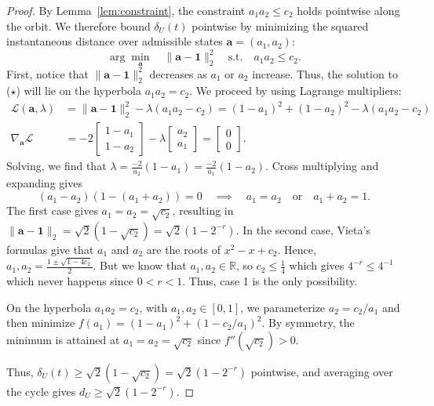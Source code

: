\documentclass[pmlr]{jmlr} %
\begin{document}
\begin{proof}
By Lemma~\ref{lem:constraint}, the constraint $a_1a_2\le c_2$ holds pointwise along the orbit. We therefore bound $\delta_U(t)$ pointwise by minimizing the squared instantaneous distance over admissible states $\mathbf{a}=(a_1,a_2)$:
\begin{equation*}
\arg\min_\mathbf{a} \quad \|\mathbf{a}-\mathbf{1}\|_2^2 \quad \text{s.t.} \quad a_1a_2\le c_2\tag{$\star$}.
\end{equation*}
First, notice that $\|\mathbf{a}-\mathbf{1}\|_2^2$ decreases as $a_1$ or $a_2$ increase. Thus, the solution to ($\star$) will lie on the hyperbola $a_1a_2=c_2$. We proceed by using Lagrange multipliers:
\begin{align}
    \mathcal{L}(\mathbf a,\lambda)&=\|\mathbf a-\mathbf 1\|_2^2 -\lambda(a_1a_2-c_2) =(1-a_1)^2+(1-a_2)^2-\lambda(a_1a_2-c_2)\\
    \nabla_\mathbf{a}\mathcal{L} &= -2\begin{bmatrix}1-a_1\\1-a_2\end{bmatrix} -\lambda \begin{bmatrix}a_2\\a_1\end{bmatrix}=\begin{bmatrix}0\\0\end{bmatrix}.
\end{align}
Solving, we find that $\lambda=\frac{-2}{a_2}(1-a_1)=\frac{-2}{a_1}(1-a_2)$. Cross multiplying and expanding gives
\[
(a_1-a_2)(1-(a_1+a_2))=0 \quad \implies \quad a_1=a_2 \quad \text{or} \quad a_1+a_2=1.
\]
The first case gives $a_1=a_2=\sqrt{c_2}$, resulting in $\|\mathbf{a}-\mathbf{1}\|_2 = \sqrt2 (1-\sqrt{c_2})=\sqrt2 (1- 2^{-r})$. In the second case, Vieta's formulas give that $a_1$ and $a_2$ are the roots of $x^2-x+c_2$. Hence, $a_1,a_2=\frac{1\pm \sqrt{1-4c_2}}{2}$. But we know that $a_1,a_2\in\mathbb{R}$, so $c_2\le \frac{1}{4}$ which gives $4^{-r} \le 4^{-1}$ which never happens since $0<r<1$. Thus, case 1 is the only possibility.

On the hyperbola $a_1a_2=c_2$, with $a_1,a_2\in[0,1]$, we parameterize $a_2=c_2/a_1$ and then minimize $f(a_1) = (1-a_1)^2 + \left(1-c_2/a_1\right)^2$. By symmetry, the minimum is attained at $a_1=a_2=\sqrt{c_2}$ since $f''(\sqrt{c_2})>0$.

Thus, $\delta_U(t) \geq \sqrt{2}(1-\sqrt{c_2})=\sqrt{2}(1-2^{-r})$ pointwise, and averaging over the cycle gives $d_U \geq \sqrt{2}(1-2^{-r})$.
\end{proof}
\end{document}
